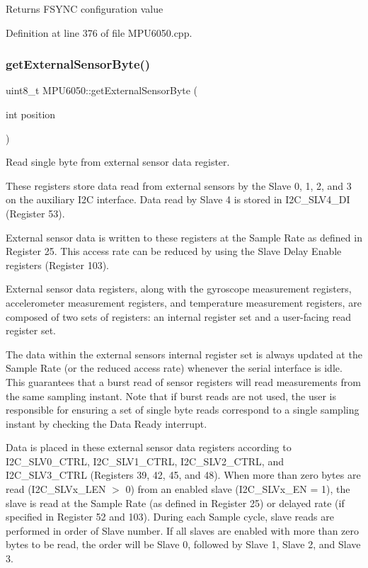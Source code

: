 \begin{DoxyReturn}{Returns}
F\+S\+Y\+NC configuration value 
\end{DoxyReturn}


Definition at line 376 of file M\+P\+U6050.\+cpp.

\mbox{\label{classMPU6050_a7f786ab4264f40e5a95e8937ec9adcc2}} 
\subsubsection{\texorpdfstring{getExternalSensorByte()}{getExternalSensorByte()}}
{\footnotesize\ttfamily uint8\+\_\+t M\+P\+U6050\+::get\+External\+Sensor\+Byte (\begin{DoxyParamCaption}\item[{int}]{position }\end{DoxyParamCaption})}



Read single byte from external sensor data register. 

These registers store data read from external sensors by the Slave 0, 1, 2, and 3 on the auxiliary I2C interface. Data read by Slave 4 is stored in I2\+C\+\_\+\+S\+L\+V4\+\_\+\+DI (Register 53).

External sensor data is written to these registers at the Sample Rate as defined in Register 25. This access rate can be reduced by using the Slave Delay Enable registers (Register 103).

External sensor data registers, along with the gyroscope measurement registers, accelerometer measurement registers, and temperature measurement registers, are composed of two sets of registers\+: an internal register set and a user-\/facing read register set.

The data within the external sensors\textquotesingle{} internal register set is always updated at the Sample Rate (or the reduced access rate) whenever the serial interface is idle. This guarantees that a burst read of sensor registers will read measurements from the same sampling instant. Note that if burst reads are not used, the user is responsible for ensuring a set of single byte reads correspond to a single sampling instant by checking the Data Ready interrupt.

Data is placed in these external sensor data registers according to I2\+C\+\_\+\+S\+L\+V0\+\_\+\+C\+T\+RL, I2\+C\+\_\+\+S\+L\+V1\+\_\+\+C\+T\+RL, I2\+C\+\_\+\+S\+L\+V2\+\_\+\+C\+T\+RL, and I2\+C\+\_\+\+S\+L\+V3\+\_\+\+C\+T\+RL (Registers 39, 42, 45, and 48). When more than zero bytes are read (I2\+C\+\_\+\+S\+L\+Vx\+\_\+\+L\+EN $>$ 0) from an enabled slave (I2\+C\+\_\+\+S\+L\+Vx\+\_\+\+EN = 1), the slave is read at the Sample Rate (as defined in Register 25) or delayed rate (if specified in Register 52 and 103). During each Sample cycle, slave reads are performed in order of Slave number. If all slaves are enabled with more than zero bytes to be read, the order will be Slave 0, followed by Slave 1, Slave 2, and Slave 3.

